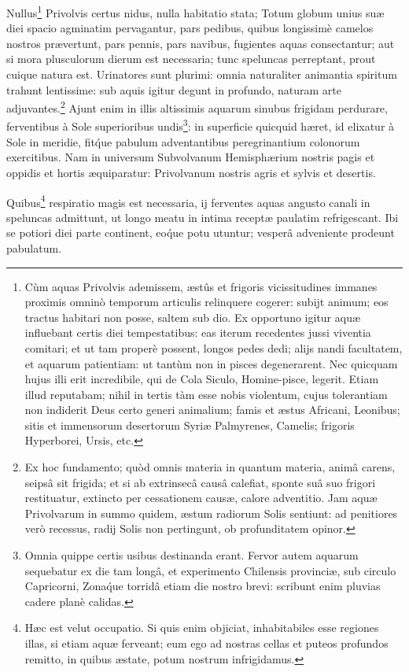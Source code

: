 \documentclass[a4paper, 11pt, oneside, polutonikogreek, german]{article}
\begin{document}
Nullus\footnote{Cùm aquas Privolvis ademissem, æstûs et frigoris vicissitudines immanes proximis omninò temporum articulis relinquere cogerer: subijt animum; eos tractus habitari non posse, saltem sub dio. Ex opportuno igitur aquæ influebant certis diei tempestatibus: eas iterum recedentes jussi viventia comitari; et ut tam properè possent, longos pedes dedi; alijs nandi facultatem, et aquarum patientiam: ut tantùm non in pisces degenerarent. Nec quicquam hujus illi erit incredibile, qui de Cola Siculo, Homine-pisce, legerit. Etiam illud reputabam; nihil in tertis tàm esse nobis violentum, cujus tolerantiam non indiderit Deus certo generi animalium; famis et æstus Africani, Leonibus; sitis et immensorum desertorum Syriæ Palmyrenes, Camelis; frigoris Hyperborei, Ursis, etc.} Privolvis certus nidus, nulla habitatio stata; Totum globum unius suæ diei spacio agminatim pervagantur, pars pedibus, quibus longissimè camelos nostros prævertunt, pars pennis, pars navibus, fugientes aquas consectantur; aut si mora plusculorum dierum est necessaria; tunc speluncas perreptant, prout cuique natura est. Urinatores sunt plurimi: omnia naturaliter animantia spiritum trahunt lentissime: sub aquis igitur degunt in profundo, naturam arte adjuvantes.\footnote{Ex hoc fundamento; quòd omnis materia in quantum materia, animâ carens, seipsâ sit frigida; et si ab extrinsecâ causâ calefiat, sponte suâ suo frigori restituatur, extincto per cessationem causæ, calore adventitio. Jam aquæ Privolvarum in summo quidem, æstum radiorum Solis sentiunt: ad penitiores verò recessus, radij Solis non pertingunt, ob profunditatem opinor.} Ajunt enim in illis altissimis aquarum sinubus frigidam perdurare, ferventibus à Sole superioribus undis\footnote{Omnia quippe certis usibus destinanda erant. Fervor autem aquarum sequebatur ex die tam longâ, et experimento Chilensis provinciæ, sub circulo Capricorni, Zona\'que torridâ etiam die nostro brevi: scribunt enim pluvias cadere planè calidas.}: in superficie quicquid hæret, id elixatur à Sole in meridie, fit\'que pabulum adventantibus peregrinantium colonorum exercitibus. Nam in universum Subvolvanum Hemisphærium nostris pagis et oppidis et hortis æquiparatur: Privolvanum nostris agris et sylvis et desertis.

Quibus\footnote{Hæc est velut occupatio. Si quis enim objiciat, inhabitabiles esse regiones illas, si etiam aquæ ferveant; eum ego ad nostras cellas et puteos profundos remitto, in quibus æstate, potum nostrum infrigidamus.} respiratio magis est necessaria, ij ferventes aquas angusto canali in speluncas admittunt, ut longo meatu in intima receptæ paulatim refrigescant. Ibi se potiori diei parte continent, eo\'que potu utuntur; vesperâ adveniente prodeunt pabulatum.
\end{document}
